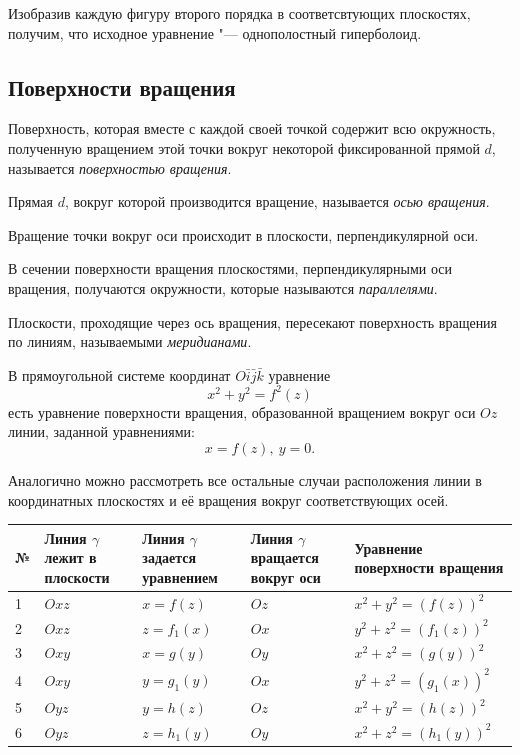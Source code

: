 \begin{example}
    Изобразив каждую фигуру второго порядка в соответсвтующих плоскостях, получим, что исходное уравнение "--- однополостный гиперболоид.
\end{example}

\subsection*{Поверхности вращения}
\begin{definition}
  Поверхность, которая вместе с каждой своей точкой содержит всю окружность, полученную вращением этой точки вокруг некоторой фиксированной прямой $d$, называется \textit{поверхностью вращения}.

  Прямая $d$, вокруг которой производится вращение, называется \textit{осью вращения}.
\end{definition}

Вращение точки вокруг оси происходит в плоскости, перпендикулярной оси.

В сечении поверхности вращения плоскостями, перпендикулярными оси вращения, получаются окружности, которые называются \textit{параллелями}.

Плоскости, проходящие через ось вращения, пересекают поверхность вращения по линиям, называемыми \textit{меридианами}.

\begin{definition}
  В прямоугольной системе координат $O\bar{i}\bar{j}\bar{k}$ уравнение $$
    x^2 + y^2 = f^2(z)
  $$
  есть уравнение поверхности вращения, образованной вращением вокруг оси $Oz$ линии, заданной уравнениями: $$
    x = f(z), ~ y = 0.
  $$
\end{definition}

Аналогично можно рассмотреть все остальные случаи расположения линии в координатных плоскостях и её вращения вокруг соответствующих осей.

\begin{table}[H]
  \centering
  \begin{tabular}{|p{1cm}|p{2cm}|p{2cm}|p{2cm}|p{4cm}|}
  \hline
      № & Линия $\gamma$ лежит в плоскости & Линия $\gamma$ задается уравнением
      & Линия $\gamma$
      вращается
      вокруг оси
       & Уравнение поверхности вращения \\ \hline
      1 & $Oxz$& $x = f(z)$ & $Oz$ & $x^2 + y^2 = (f(z))^2$ \\ \hline
      2 & $Oxz$ & $z = f_1(x)$ & $Ox$ & $y^2 + z^2 = (f_1(z))^2$ \\ \hline
      3 & $Oxy$ & $x = g(y)$ & $Oy$ & $x^2 + z^2 = (g(y))^2$ \\ \hline
      4 & $Oxy$ & $y = g_1(y)$ & $Ox$ & $y^2 + z^2 = (g_1(x))^2$ \\ \hline
      5 & $Oyz$ & $y = h(z)$ & $Oz$ & $x^2 + y^2 = (h(z))^2$ \\ \hline
      6 & $Oyz$ & $z = h_1(y)$ & $Oy$ & $x^2 + z^2 = (h_1(y))^2$ \\ \hline
  \end{tabular}
\end{table}

